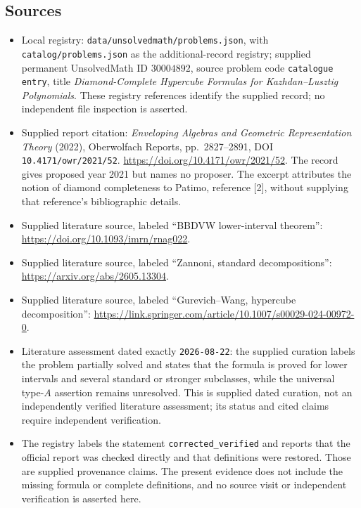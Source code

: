 \documentclass[11pt]{article}
\begin{document}
\subsection{Sources}
\begin{itemize}
\item Local registry: \texttt{data/unsolvedmath/problems.json}, with \texttt{catalog/problems.json} as the additional-record registry; supplied permanent UnsolvedMath ID \(30004892\), source problem code \texttt{catalogue entry}, title \emph{Diamond-Complete Hypercube Formulas for Kazhdan--Lusztig Polynomials}. These registry references identify the supplied record; no independent file inspection is asserted.
\item Supplied report citation: \emph{Enveloping Algebras and Geometric Representation Theory} (2022), Oberwolfach Reports, pp.\ 2827--2891, DOI \texttt{10.4171/owr/2021/52}. \url{https://doi.org/10.4171/owr/2021/52}. The record gives proposed year 2021 but names no proposer. The excerpt attributes the notion of diamond completeness to Patimo, reference [2], without supplying that reference's bibliographic details.
\item Supplied literature source, labeled ``BBDVW lower-interval theorem'': \url{https://doi.org/10.1093/imrn/rnag022}.
\item Supplied literature source, labeled ``Zannoni, standard decompositions'': \url{https://arxiv.org/abs/2605.13304}.
\item Supplied literature source, labeled ``Gurevich--Wang, hypercube decomposition'': \url{https://link.springer.com/article/10.1007/s00029-024-00972-0}.
\item Literature assessment dated exactly \texttt{2026-08-22}: the supplied curation labels the problem partially solved and states that the formula is proved for lower intervals and several standard or stronger subclasses, while the universal type-\(A\) assertion remains unresolved. This is supplied dated curation, not an independently verified literature assessment; its status and cited claims require independent verification.
\item The registry labels the statement \texttt{corrected\_verified} and reports that the official report was checked directly and that definitions were restored. Those are supplied provenance claims. The present evidence does not include the missing formula or complete definitions, and no source visit or independent verification is asserted here.
\end{itemize}
\end{document}
